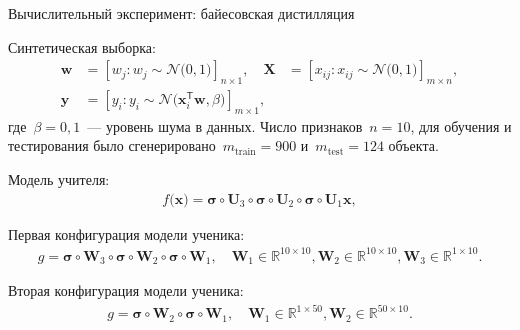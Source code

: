 \documentclass[10pt,pdf,hyperref={unicode}]{beamer}
\begin{document}
\begin{frame}{Вычислительный эксперимент: байесовская дистилляция}

Синтетическая выборка:
\[
\label{eq:ex:1}
\begin{aligned}
\textbf{w} &= \left[w_j: w_{j}\sim \mathcal{N}\bigr(0, 1\bigr)\right]_{n\times 1}, \quad \textbf{X} &= \left[x_{ij}: x_{ij}\sim\mathcal{N}\bigr(0, 1\bigr)\right]_{m\times n}, \\
 \textbf{y} &= \left[y_i: y_i \sim \mathcal{N}\bigr(\textbf{x}_i^{\mathsf{T}}\textbf{w}, \beta\bigr)\right]_{m \times 1},
\end{aligned}
\]
где~$\beta=0{,}1$~--- уровень шума в данных. Число признаков~$n=10$, для обучения и тестирования было сгенерировано~$m_{\text{train}}=900$ и~$m_{\text{test}}=124$ объекта.

Модель учителя:
\[
\begin{aligned}
f\bigr(\textbf{x}\bigr) = \bm{\sigma} \circ \textbf{U}_3\circ \bm{\sigma} \circ \textbf{U}_2\circ\bm{\sigma}\circ \textbf{U}_1\textbf{x},
\end{aligned}
\]

Первая конфигурация модели ученика:
\[
\begin{aligned}
g = \bm{\sigma} \circ \textbf{W}_3 \circ \bm{\sigma} \circ \textbf{W}_2 \circ \bm{\sigma} \circ \textbf{W}_1, \quad \textbf{W}_{1} \in \mathbb{R}^{10 \times 10}, \textbf{W}_{2} \in \mathbb{R}^{10 \times 10},  \textbf{W}_{3} \in \mathbb{R}^{1 \times 10}.
\end{aligned}
\]

Вторая конфигурация модели ученика:
\[
\begin{aligned}
g = \bm{\sigma} \circ \textbf{W}_2 \circ \bm{\sigma} \circ \textbf{W}_1, \quad \textbf{W}_{1} \in \mathbb{R}^{1 \times 50}, \textbf{W}_{2} \in \mathbb{R}^{50 \times 10}.
\end{aligned}
\]
\end{frame}
\end{document}
